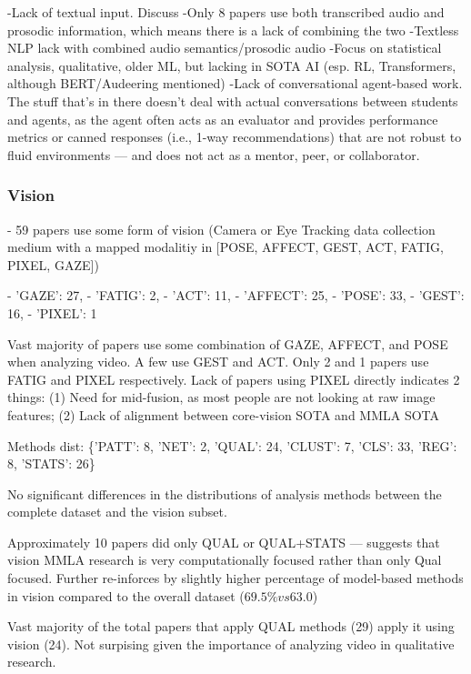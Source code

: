 \documentclass[manuscript,screen,review]{acmart}
\begin{document}
-Lack of textual input. Discuss
-Only 8 papers use both transcribed audio and prosodic information, which means there is a lack of combining the two
    -Textless NLP lack with combined audio semantics/prosodic audio
-Focus on statistical analysis, qualitative, older ML, but lacking in SOTA AI (esp. RL, Transformers, although BERT/Audeering mentioned)
-Lack of conversational agent-based work. The stuff that's in there doesn't deal with actual conversations between students and agents, as the agent often acts as an evaluator and provides performance metrics or canned responses (i.e., 1-way recommendations) that are not robust to fluid environments  --- and does not act as a mentor, peer, or collaborator.


\subsubsection{Vision}
- 59 papers use some form of vision (Camera or Eye Tracking data collection medium with a mapped modalitiy in [POSE, AFFECT, GEST, ACT, FATIG, PIXEL, GAZE])

- 'GAZE': 27,
- 'FATIG': 2,
- 'ACT': 11,
- 'AFFECT': 25,
- 'POSE': 33,
- 'GEST': 16,
- 'PIXEL': 1

Vast majority of papers use some combination of GAZE, AFFECT, and POSE when analyzing video. A few use GEST and ACT. Only 2 and 1 papers use FATIG and PIXEL respectively. Lack of papers using PIXEL directly indicates 2 things: (1) Need for mid-fusion, as most people are not looking at raw image features; (2) Lack of alignment between core-vision SOTA and MMLA SOTA

Methods dist: \{'PATT': 8, 'NET': 2, 'QUAL': 24, 'CLUST': 7, 'CLS': 33, 'REG': 8, 'STATS': 26\}

No significant differences in the distributions of analysis methods between the complete dataset and the vision subset.

Approximately 10 papers did only QUAL or QUAL+STATS --- suggests that vision MMLA research is very computationally focused rather than only Qual focused. Further re-inforces by slightly higher percentage of model-based methods in vision compared to the overall dataset ($69.5\% vs 63.0$)

Vast majority of the total papers that apply QUAL methods (29) apply it using vision (24). Not surpising given the importance of analyzing video in qualitative research.
\end{document}

